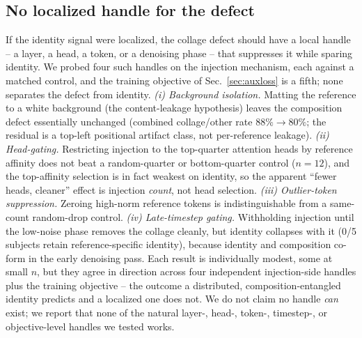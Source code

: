 \subsection{No localized handle for the defect}\label{sec:repairs}

If the identity signal were localized, the collage defect should have a
local handle -- a layer, a head, a token, or a denoising phase -- that
suppresses it while sparing identity. We probed four such handles on the
injection mechanism, each against a matched control, and the training
objective of Sec.~\ref{sec:auxloss} is a fifth; none separates the defect
from identity. \emph{(i) Background isolation.} Matting the reference to
a white background (the content-leakage hypothesis) leaves the
composition defect essentially unchanged (combined collage/other rate
$88\%\to80\%$; the residual is a top-left positional artifact class, not
per-reference leakage). \emph{(ii) Head-gating.} Restricting injection to
the top-quarter attention heads by reference affinity does not beat a
random-quarter or bottom-quarter control ($n{=}12$), and the
top-affinity selection is in fact weakest on identity, so the apparent
``fewer heads, cleaner'' effect is injection \emph{count}, not head
selection. \emph{(iii) Outlier-token suppression.} Zeroing high-norm
reference tokens is indistinguishable from a same-count random-drop
control. \emph{(iv) Late-timestep gating.} Withholding injection until
the low-noise phase removes the collage cleanly, but identity collapses
with it (0/5 subjects retain reference-specific identity), because
identity and composition co-form in the early denoising pass. Each
result is individually modest, some at small $n$, but they agree in
direction across four independent injection-side handles plus the
training objective -- the outcome a distributed, composition-entangled
identity predicts and a localized one does not. We do not claim no handle
\emph{can} exist; we report that none of the natural layer-, head-,
token-, timestep-, or objective-level handles we tested works.
